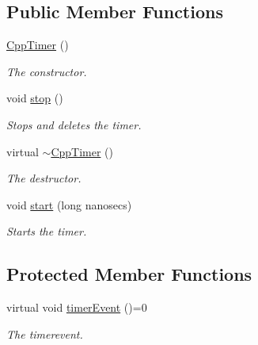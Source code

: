 \subsection*{Public Member Functions}
\begin{DoxyCompactItemize}
\item 
\mbox{\label{classCppTimer_a327a07c051b9b60fcc61e6fd8f40f381}} 
\hyperlink{classCppTimer_a327a07c051b9b60fcc61e6fd8f40f381}{Cpp\+Timer} ()
\begin{DoxyCompactList}\small\item\em The constructor. \end{DoxyCompactList}\item 
\mbox{\label{classCppTimer_a4bb95ddee98a536d0818b8f6096bf7e7}} 
void \hyperlink{classCppTimer_a4bb95ddee98a536d0818b8f6096bf7e7}{stop} ()
\begin{DoxyCompactList}\small\item\em Stops and deletes the timer. \end{DoxyCompactList}\item 
\mbox{\label{classCppTimer_a2942aab831713273a76218048fe61b16}} 
virtual \hyperlink{classCppTimer_a2942aab831713273a76218048fe61b16}{$\sim$\+Cpp\+Timer} ()
\begin{DoxyCompactList}\small\item\em The destructor. \end{DoxyCompactList}\item 
\mbox{\label{classCppTimer_a8d284721892e8e2665433f17045143e8}} 
void \hyperlink{classCppTimer_a8d284721892e8e2665433f17045143e8}{start} (long nanosecs)
\begin{DoxyCompactList}\small\item\em Starts the timer. \end{DoxyCompactList}\end{DoxyCompactItemize}
\subsection*{Protected Member Functions}
\begin{DoxyCompactItemize}
\item 
virtual void \hyperlink{classCppTimer_ac2665403595b6aee5f581d0ebfeb886c}{timer\+Event} ()=0
\begin{DoxyCompactList}\small\item\em The timerevent. \end{DoxyCompactList}\end{DoxyCompactItemize}



